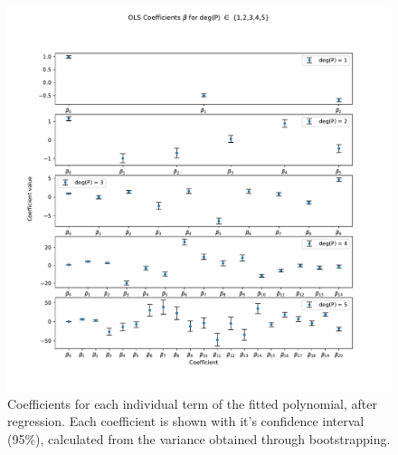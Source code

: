 \begin{figure}[h]
    \includegraphics[width = 0.8\paperwidth]{figures/coeffs_vs_complexity_ols.pdf}
    \caption{Coefficients for each individual term of the fitted polynomial, after regression. Each
	coefficient is shown with it's confidence interval (95\%), calculated from the variance obtained
	through bootstrapping.}
    \label{fig:ols-coeff-complexity}
\end{figure}

